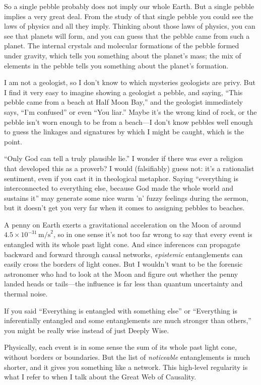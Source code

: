 {
 So a single pebble probably does not imply our whole Earth. But a
single pebble implies a very great deal. From the study of that single
pebble you could see the laws of physics and all they imply. Thinking
about those laws of physics, you can see that planets will form, and
you can guess that the pebble came from such a planet. The internal
crystals and molecular formations of the pebble formed under gravity,
which tells you something about the planet's mass; the
mix of elements in the pebble tells you something about the
planet's formation.}

{
 I am not a geologist, so I don't know to which
mysteries geologists are privy. But I find it very easy to imagine
showing a geologist a pebble, and saying, ``This
pebble came from a beach at Half Moon Bay,'' and the
geologist immediately says, ``I'm
confused'' or even ``You
liar.'' Maybe it's the wrong kind of
rock, or the pebble isn't worn enough to be from a
beach---I don't know pebbles well enough to guess the
linkages and signatures by which I might be caught, which is the
point.}

{
 ``Only God can tell a truly plausible
lie.'' I wonder if there was ever a religion that
developed this as a proverb? I would (falsifiably) guess not:
it's a rationalist sentiment, even if you cast it in
theological metaphor. Saying ``everything is
interconnected to everything else, because God made the whole world and
sustains it'' may generate some nice warm
'n' fuzzy feelings during the sermon,
but it doesn't get you very far when it comes to
assigning pebbles to beaches.}

{
 A penny on Earth exerts a gravitational acceleration on the Moon
of around $4.5 \times 10^{-31}\,
\mathrm{m/s}^{2}$, so in one sense it's not too
far wrong to say that every event is entangled with its whole past
light cone. And since inferences can propagate backward and forward
through causal networks, \textit{epistemic} entanglements can easily
cross the borders of light cones. But I wouldn't want
to be the forensic astronomer who had to look at the Moon and figure
out whether the penny landed heads or tails---the influence is far less
than quantum uncertainty and thermal noise.}

{
 If you said ``Everything is entangled with
something else'' or ``Everything is
inferentially entangled and some entanglements are much stronger than
others,'' you might be really wise instead of just
Deeply Wise.}

{
 Physically, each event is in some sense the sum of its whole past
light cone, without borders or boundaries. But the list of
\textit{noticeable} entanglements is much shorter, and it gives you
something like a network. This high-level regularity is what I refer to
when I talk about the Great Web of Causality.}

